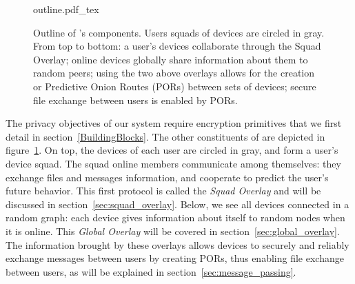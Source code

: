 \begin{figure}[t]
\centering
\def\svgwidth{0.8\columnwidth}
%
{outline.pdf_tex}
\caption{\label{fig:outline}Outline of \name's components. Users squads of devices are circled in gray. From top to bottom: a user's devices collaborate through the Squad Overlay; online devices globally share information about them to random peers; using the two above overlays allows for the creation or Predictive Onion Routes (PORs) between sets of devices; secure file exchange between users is enabled by PORs.}
\end{figure}

The privacy objectives of our system require encryption primitives that we first detail in section~\ref{BuildingBlocks}. The other constituents of \name are depicted in figure~\ref{fig:outline}.
On top, the devices of each user are circled in gray, and form a user's device squad. The squad online members communicate among themselves: they exchange files and messages information, and cooperate to predict the user's future behavior. 
This first protocol is called the \emph{Squad Overlay} and will be discussed in section~\ref{sec:squad_overlay}.
Below, we see all devices connected in a random graph: each device gives information about itself to random nodes when it is online. 
This \emph{Global Overlay} will be covered in section~\ref{sec:global_overlay}.
The information brought by these overlays allows devices to securely and reliably exchange messages between users by creating PORs, thus enabling file exchange between users, as will be explained in section~\ref{sec:message_passing}.






%
